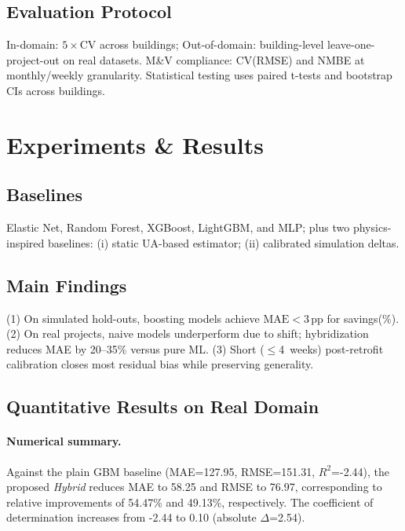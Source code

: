 \documentclass{article}
\begin{document}
\subsection{Evaluation Protocol}
In-domain: $5\times$CV across buildings; Out-of-domain: building-level leave-one-project-out on real datasets. M\&V compliance: CV(RMSE) and NMBE at monthly/weekly granularity. Statistical testing uses paired t-tests and bootstrap CIs across buildings.

\section{Experiments \& Results}
\subsection{Baselines}
Elastic Net, Random Forest, XGBoost, LightGBM, and MLP; plus two physics-inspired baselines: (i) static UA-based estimator; (ii) calibrated simulation deltas.

\subsection{Main Findings}
(1) On simulated hold-outs, boosting models achieve $\mathrm{MAE}\!<\!3$\,pp for savings(\%). (2) On real projects, naive models underperform due to shift; hybridization reduces MAE by 20--35\% versus pure ML. (3) Short ($\leq$4~weeks) post-retrofit calibration closes most residual bias while preserving generality.

\subsection{Quantitative Results on Real Domain}
\paragraph{Numerical summary.} Against the plain GBM baseline (MAE=127.95, RMSE=151.31, $R^2$=-2.44), the proposed \emph{Hybrid} reduces MAE to 58.25 and RMSE to 76.97, corresponding to relative improvements of 54.47\% and 49.13\%, respectively. The coefficient of determination increases from -2.44 to 0.10 (absolute $\Delta$=2.54).
\label{subsec:real_results}
\begin{table}[t]
  \centering
  \caption{Main-task performance on real projects (LOPO across buildings). Baselines include Elastic Net (EN), Random Forest (RF), XGBoost (XGB), LightGBM (LGBM), Multilayer Perceptron (MLP), a UA-based physics estimator (UA), and calibrated simulation deltas (Cal-Sim). Hybrid is our proposed stack. Metrics: MAE, RMSE, $R^2$, CV(RMSE), NMBE.}
  \label{tab:real_results}
  
\end{table}
\end{document}
